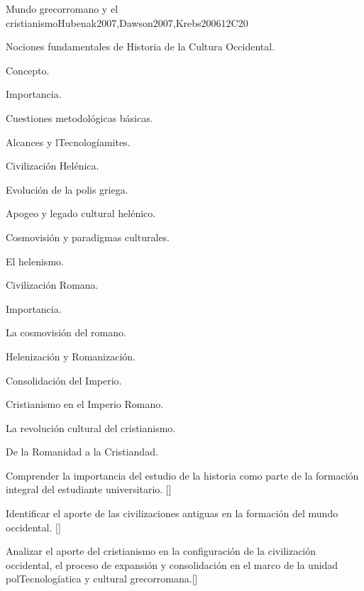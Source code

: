 \begin{syllabus}
\begin{unit}{}{Mundo grecorromano y el cristianismo}{Hubenak2007,Dawson2007,Krebs2006}{12}{C20}
\begin{topics}
	\item Nociones fundamentales de Historia de la Cultura Occidental.
	     \begin{subtopics}
		\item Concepto.
		\item Importancia.
		\item Cuestiones metodológicas básicas.
		\item Alcances y lTecnologíamites.
	    \end{subtopics}
	\item Civilización Helénica.
	    \begin{subtopics}
		\item Evolución de la polis griega.
		\item Apogeo y legado cultural helénico.
		\item Cosmovisión y paradigmas culturales.
		\item El helenismo.
	    \end{subtopics}
	\item Civilización Romana.
	    \begin{subtopics}
		\item Importancia.
		\item La cosmovisión del romano.
		\item Helenización y Romanización.
		\item Consolidación del Imperio.
	    \end{subtopics}
	\item Cristianismo en el Imperio Romano.
	    \begin{subtopics}
		\item La revolución cultural del cristianismo.
		\item De la Romanidad a la Cristiandad.
	    \end{subtopics}
\end{topics}
\begin{learningoutcomes}
	\item Comprender la importancia del estudio de la historia como parte de la formación integral del estudiante universitario. [\Familiarity]
	\item Identificar el aporte de las civilizaciones antiguas en la formación del mundo occidental. [\Familiarity]
	\item Analizar el aporte del cristianismo en la configuración de la civilización occidental, el proceso de expansión y consolidación en el marco de la unidad polTecnologíatica y cultural grecorromana.[\Familiarity]
\end{learningoutcomes}
\end{unit}


\end{syllabus}
